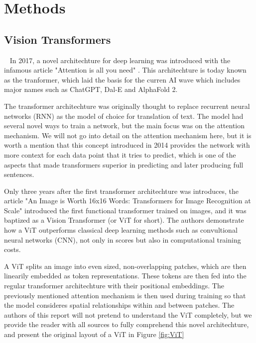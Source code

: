 \section{Methods}\label{sec:methods}

%

\subsection{Vision Transformers} \label{ssec:vit}
In 2017, a novel architechture for deep learning was introduced with the infamous article 
"Attention is all you need" \cite{attention}. This architechture is today known as the 
tranformer, which laid the basis for the curren AI wave which includes major 
names such as ChatGPT, Dal-E and AlphaFold 2.

The transformer architechture was originally thought to replace recurrent neural networks (RNN)
as the model of choice for translation of text. The model had several novel ways to train a network,
but the main focus was on the attention mechanism. We will not go into detail on the attention
mechanism here, but it is worth a mention that this concept introduced in 2014 \cite{first_attention}
provides the network with more context for each data point that it tries to predict, which is one
of the aspects that made transformers superior in predicting and later producing full sentences. 

Only three years after the first transformer architechture was introduces, the article 
"An Image is Worth 16x16 Words: Transformers for Image Recognition at Scale" \cite{first_vit}
introduced the first functional transformer trained on images, and it was baptized as a Vision
Transformer (or ViT for short). The authors demonstrate how a ViT outperforms classical 
deep learning methods such as convultional neural networks (CNN), not only in scores but also
in computational training costs.

A ViT splits an image into even sized, non-overlapping patches, which are then linearily embedded
as token representations. These tokens are then fed into the regular transformer architechture with 
their positional embeddings. The previously mentioned attention mechanism is then used during training
so that the model consideres spatial relationships within and between patches. The authors of this 
report will not pretend to understand the ViT completely, but we provide the reader with all sources
to fully comprehend this novel architechture, and present the original layout of a ViT in Figure \ref{fig:ViT}

